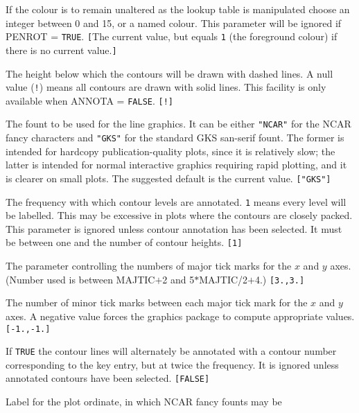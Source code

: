 \documentclass[twoside,11pt]{article}
\newcommand{\sstsubsection}[1]{ \item[{#1}] \mbox{} \\}
\renewcommand{\sstsubsection}[1]{\item[{#1}]}
\begin{document}
{{{         If the colour is to remain unaltered as the lookup table is
         manipulated choose an integer between 0 and 15, or a named
         colour.  This parameter will be ignored if PENROT = {\tt TRUE}.
         {\tt [}The current value, but equals {\tt 1} (the foreground
         colour) if there is no current value.{\tt ]}
      }
      \sstsubsection{
         DASHED = \_REAL (Read)
      }{
         The height below which the contours will be drawn with dashed
         lines.  A null value ({\tt !}) means all contours are drawn with
         solid lines.  This facility is only available when ANNOTA =
         {\tt FALSE}. {\tt [!]}
      }
      \sstsubsection{
         FONT = LITERAL (Read)
      }{
         The fount to be used for the line graphics.  It can be either
         {\tt "NCAR"} for the NCAR fancy characters and {\tt "GKS"} for the standard
         GKS san-serif fount.   The former is intended for hardcopy
         publication-quality plots, since it is relatively slow; the
         latter is intended for normal interactive graphics requiring
         rapid plotting, and it is clearer on small plots. The
         suggested default is the current value. {\tt ["GKS"]}
      }
      \sstsubsection{
         LABELFREQ = \_INTEGER (Read)
      }{
         The frequency with which contour levels are annotated.  {\tt 1}
         means every level will be labelled.  This may be excessive in
         plots where the contours are closely packed.  This parameter
         is ignored
         unless contour annotation has been selected.  It must be between
         one and the number of contour heights. {\tt [1]}
      }
      \sstsubsection{
         MAJTIC( 2 ) = \_REAL (Read)
      }{
         The parameter controlling the numbers of major tick marks
         for the $x$ and $y$ axes.  (Number used is between MAJTIC$+$2 and
         5$*$MAJTIC/2$+$4.) {\tt [3.,3.]}
      }
      \sstsubsection{
         MINTIC( 2 ) = \_REAL (Read)
      }{
         The number of minor tick marks between each major tick mark
         for the $x$ and $y$ axes.  A negative value forces the graphics
         package to compute appropriate values. {\tt [-1.,-1.]}
      }
      \sstsubsection{
         NOISY = \_LOGICAL (Read)
      }{
         If {\tt TRUE} the contour lines will alternately be annotated with
         a contour number corresponding to the key entry, but at
         twice the frequency.  It is ignored unless annotated contours
         have been selected. {\tt [FALSE]}
      }
      \sstsubsection{
         ORDLAB  =  LITERAL (Read)
      }{
         Label for the plot ordinate, in which NCAR fancy founts may be
}}}
\end{document}
